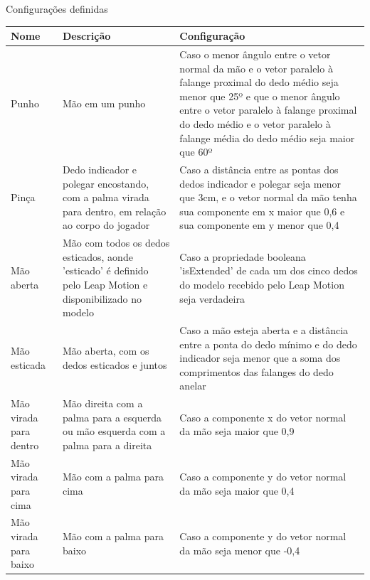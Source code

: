 \begin{quadro}[htb] \scriptsize
	\centering
	\caption[Configurações definidas]{Configurações definidas}
	
	\begin{tabular}{|>{\centering\arraybackslash}m{2.1cm}|>{\centering\arraybackslash}m{5.4cm}|>{\centering\arraybackslash}m{7.4cm}|}
		\hline 
		\textbf{Nome} & \textbf{Descrição} & \textbf{Configuração} \\
		\hline 
		Punho
		&Mão em um punho
		&Caso o menor ângulo entre o vetor normal da mão e o vetor 
		paralelo à falange proximal do dedo médio seja menor que 25º 
		e que o menor ângulo entre o vetor paralelo à falange proximal 
		do dedo médio e o vetor paralelo à falange média do dedo médio 
		seja maior que 60º
		\\ \hline 
		Pinça
		&Dedo indicador e polegar encostando, com a palma virada para 
		dentro, em relação ao corpo do jogador
		&Caso a distância entre as pontas dos dedos indicador e polegar 
		seja menor que 3cm, e o vetor normal da mão tenha sua componente 
		em x maior que 0,6 e sua componente em y menor que 0,4
		\\ \hline 
		Mão aberta
		&Mão com todos os dedos esticados, aonde 'esticado' é definido 
		pelo Leap Motion e disponibilizado no modelo
		&Caso a propriedade booleana 'isExtended' de cada um dos cinco 
		dedos do modelo recebido pelo Leap Motion seja verdadeira
		\\ \hline 
		Mão esticada
		&Mão aberta, com os dedos esticados e juntos
		&Caso a mão esteja aberta e a distância entre a ponta do dedo 
		mínimo e do dedo indicador seja menor que a soma dos comprimentos 
		das falanges do dedo anelar
		\\ \hline 
		Mão virada para dentro
		&Mão direita com a palma para a esquerda ou mão esquerda com 
		a palma para a direita
		&Caso a componente x do vetor normal da mão seja maior que 0,9
		\\ \hline 		
		Mão virada para cima
		&Mão com a palma para cima
		&Caso a componente y do vetor normal da mão seja maior que 0,4
		\\ \hline 
		Mão virada para baixo
		&Mão com a palma para baixo
		&Caso a componente y do vetor normal da mão seja menor que -0,4
		\\ \hline 
	\end{tabular} 
	
	\legend{\fonteAP}
	\label{tabela:gestos-configuracoes}
\end{quadro}

